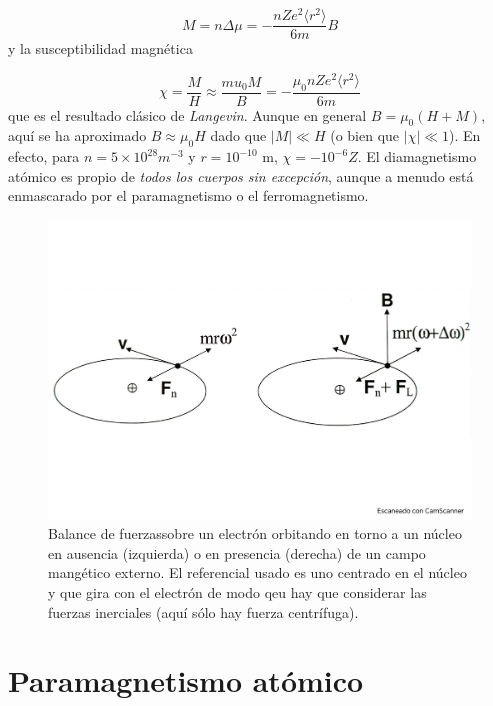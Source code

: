 \begin{equation}
	M = n \Delta \mu = - \frac{nZe^2 \langle r^2 \rangle}{6m}B
\end{equation}
y la susceptibilidad magnética 

\begin{equation}
	\chi = \frac{M}{H} \approx \frac{mu_0 M}{B} = - \frac{\mu_0 n Z e^2 \langle r^2 \rangle}{6m}
\end{equation}
que es el resultado clásico de \textit{Langevin}. Aunque en general $B=\mu_0 (H+M)$, aquí se ha aproximado $B\approx \mu_0 H$ dado que $|M|\ll H$ (o bien que $|\chi |\ll 1$). En efecto, para $n=5\times10^{28} \unit{m}^{-3}$ y $r=10^{-10}$ m, $\chi = -10^{-6}Z$. El diamagnetismo atómico es propio de \textit{todos los cuerpos sin excepción}, aunque a menudo está enmascarado por el paramagnetismo o el ferromagnetismo.



\begin{figure}[h!] \centering
	\includegraphics[scale=0.35]{Cuerpo/Ch_10/Fotos libro 1.pdf}
	\caption{Balance  de fuerzassobre un electrón orbitando en torno a un núcleo en ausencia (izquierda) o en presencia (derecha) de un campo mangético externo. El referencial usado es uno centrado en el núcleo y que gira con el electrón de modo qeu hay que considerar las fuerzas inerciales (aquí sólo hay fuerza centrífuga).}
	\label{Fig:10-01}
\end{figure}

\section{Paramagnetismo atómico}

